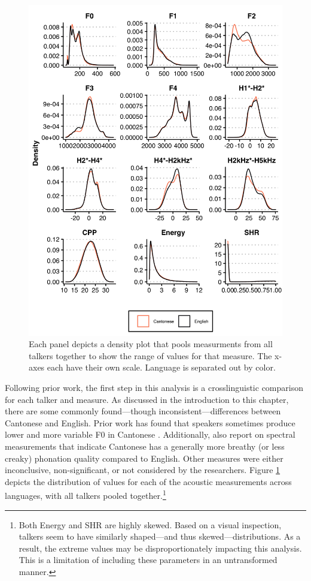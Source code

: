 \begin{figure}[ptbh]
    \begin{center}
    \includegraphics[width=0.9\linewidth]{figures/ch3_allmeasuresdensity_5in.png} 
    \caption{Each panel depicts a density plot that pools measurments from all talkers together to show the range of values for that measure. The x-axes each have their own scale. Language is separated out by color.}
    \label{ch3:fig:allmeasures}
    \end{center}
\end{figure} 

Following prior work, the first step in this analysis is a crosslinguistic comparison for each talker and measure. As discussed in the introduction to this chapter, there are some commonly found---though inconsistent---differences between Cantonese and English. Prior work has found that speakers sometimes produce lower and more variable F0 in Cantonese \citep{altenberg_2006_f0,ng_2012_ltas,ng_2010_voice}. Additionally, \citet{ng_2012_ltas} also report on spectral measurements that indicate Cantonese has a generally more breathy (or less creaky) phonation quality compared to English. Other measures were either inconclusive, non-significant, or not considered by the researchers. Figure \ref{ch3:fig:allmeasures} depicts the distribution of values for each of the acoustic measurements across languages, with all talkers pooled together.\footnote{Both Energy and SHR are highly skewed. Based on a visual inspection, talkers seem to have similarly shaped---and thus skewed---distributions. As a result, the extreme values may be disproportionately impacting this analysis. This is a limitation of including these parameters in an untransformed manner.}

